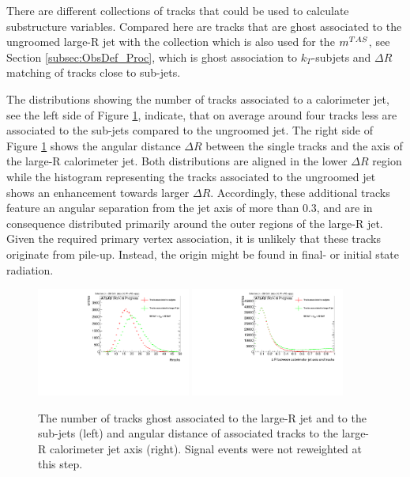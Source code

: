 There are different collections of tracks that could be used to calculate substructure variables. Compared here are tracks that are ghost associated to the ungroomed large-R jet with the collection which is also used for the $m^{TAS}$, see Section \ref{subsec:ObsDef_Proc}, which is ghost association to $k_T$-subjets and $\Delta R$ matching of tracks close to sub-jets.

The distributions showing the number of tracks associated to a calorimeter jet, see the left side of Figure \ref{fig:delta_R}, indicate, that on average around four tracks less are associated to the sub-jets compared to the ungroomed jet. The right side of Figure \ref{fig:delta_R} shows the angular distance $\Delta R$ between the single tracks and the axis of the large-R calorimeter jet. Both distributions are aligned in the lower $\Delta R$ region while the histogram representing the tracks associated to the ungroomed jet shows an enhancement towards larger $\Delta R$. Accordingly, these additional tracks feature an angular separation from the jet axis of more than $0.3$, and are in consequence distributed primarily around the outer regions of the large-R jet. Given the required primary vertex association, it is unlikely that these tracks originate from pile-up. Instead, the origin might be found in final- or initial state radiation. 
\begin{figure}
	\centering
	\includegraphics[width=0.45\textwidth]{sascha_input/plots/track_selection/h_customghost_number.pdf} \hspace{1mm}
	\includegraphics[width=0.45\textwidth]{sascha_input/plots/track_selection/h_customghost_dr.pdf}
\caption{\footnotesize{The number of tracks ghost associated to the large-R jet and to the sub-jets (left) and angular distance of associated tracks to the large-R calorimeter jet axis (right). Signal events were not reweighted at this step.}}\label{fig:delta_R}
\end{figure}






